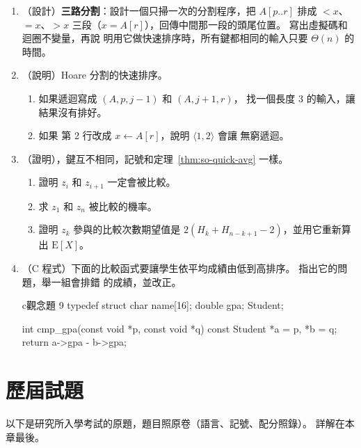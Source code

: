 \begin{enumerate}
\item （設計）\textbf{三路分割}：設計一個只掃一次的分割程序，把 $A[p..r]$ 排成 $< x$、
$= x$、$> x$ 三段（$x = A[r]$），回傳中間那一段的頭尾位置。 寫出虛擬碼和迴圈不變量，再說
明用它做快速排序時，所有鍵都相同的輸入只要 $\Theta(n)$ 的時間。

\item （說明）Hoare 分割的快速排序。
\begin{enumerate}
\item 如果遞迴寫成 $(A, p, j - 1)$ 和 $(A, j + 1, r)$，
找一個長度 $3$ 的輸入，讓結果沒有排好。
\item 如果  第 2 行改成 $x \gets A[r]$，說明 $\langle 1, 2 \rangle$ 會讓
 無窮遞迴。
\end{enumerate}

\item （證明），鍵互不相同，記號和定理~\ref{thm:so-quick-avg}
一樣。
\begin{enumerate}
\item 證明 $z_i$ 和 $z_{i+1}$ 一定會被比較。
\item 求 $z_1$ 和 $z_n$ 被比較的機率。
\item 證明 $z_k$ 參與的比較次數期望值是 $2(H_k + H_{n-k+1} - 2)$，並用它重新算出
$\mathrm{E}[X]$。
\end{enumerate}

\item （C 程式）下面的比較函式要讓學生依平均成績由低到高排序。 指出它的問題，舉一組會排錯
的成績，並改正。
\begin{code}{c}{觀念題 9}
typedef struct {
    char name[16];
    double gpa;
} Student;

int cmp_gpa(const void *p, const void *q)
{
    const Student *a = p, *b = q;
    return a->gpa - b->gpa;
}
\end{code}
\end{enumerate}

\section{歷屆試題}
\label{sec:so-pastexam}

以下是研究所入學考試的原題，題目照原卷（語言、記號、配分照錄）。 詳解在本章最後。

